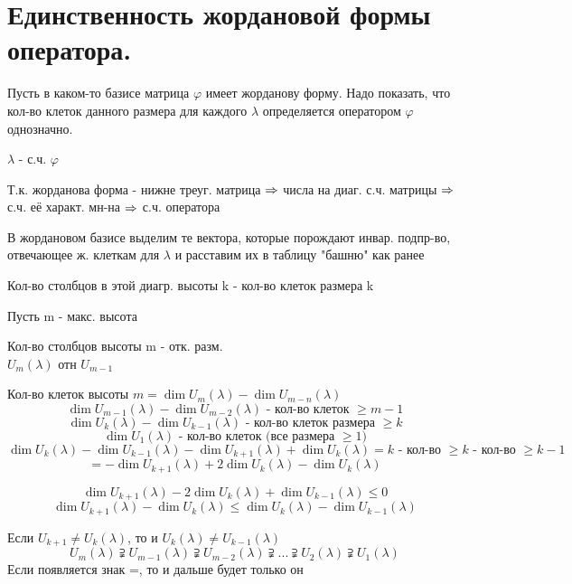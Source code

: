 \documentclass[algebra]{subfiles}
\begin{document}
    \section{Единственность жордановой формы оператора.}

    Пусть в каком-то базисе матрица $\varphi$ имеет жорданову форму. Надо показать, что кол-во клеток данного размера для каждого $\lambda$ определяется оператором $\varphi$ однозначно.

    $\lambda$ - с.ч. $\varphi$

    Т.к. жорданова форма - нижне треуг. матрица $\Rightarrow$ числа на диаг. с.ч. матрицы $\Rightarrow$ с.ч. её характ. мн-на $\Rightarrow$ с.ч. оператора

    В жордановом базисе выделим те вектора, которые порождают инвар. подпр-во, отвечающее ж. клеткам для $\lambda$ и расставим их в таблицу "башню"{} как ранее

    Кол-во столбцов в этой диагр. высоты k - кол-во клеток размера k

    Пусть m - макс. высота

    Кол-во столбцов высоты m - отк. разм.\\
    $U_m(\lambda)$ отн $U_{m-1}$

    Кол-во клеток высоты $m = \dim U_m(\lambda) - \dim U_{m-n}(\lambda)$
    \[\dim U_{m-1}(\lambda) - \dim U_{m-2}(\lambda) \text{ - кол-во клеток $\geq m-1$}\]
    \[\dim U_k (\lambda) - \dim U_{k-1}(\lambda) \text{ - кол-во клеток размера $\geq k$}\]
    \[\dim U_1(\lambda) \text{ - кол-во клеток (все размера $\geq 1$)}\]
    \[\dim U_k(\lambda) - \dim U_{k-1}(\lambda) - \dim U_{k+1}(\lambda) + \dim U_k(\lambda) = k \text{ - кол-во $\geq k$ - кол-во $\geq k-1$}\]
    \[= - \dim U_{k+1}(\lambda) + 2\dim U_k(\lambda) - \dim U_k(\lambda)\]

    \begin{Consequence}
        \[\dim U_{k+1}(\lambda) - 2 \dim U_k(\lambda) + \dim U_{k-1}(\lambda) \leq 0\]
        \[\dim U_{k+1}(\lambda) - \dim U_k(\lambda) \leq \dim U_k(\lambda) - \dim U_{k-1}(\lambda)\]
    \end{Consequence}

    \begin{consequence}
        Если $U_{k+1} \neq U_k(\lambda)$, то и $U_k(\lambda) \neq U_{k-1}(\lambda)$
        \[U_m(\lambda) \supsetneqq U_{m-1} (\lambda) \supsetneqq U_{m-2} (\lambda) \supsetneqq ... \supsetneqq U_2(\lambda) \supsetneqq U_1(\lambda)\]
        Если появляется знак =, то и дальше будет только он
    \end{consequence}
\end{document}

